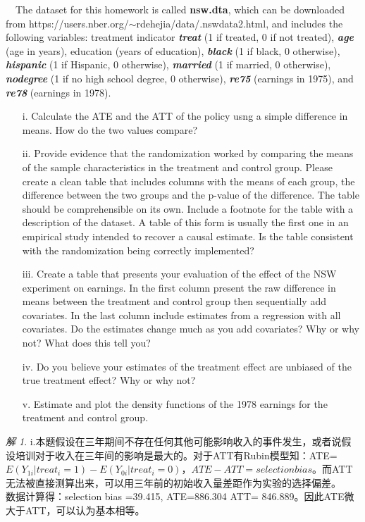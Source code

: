 \documentclass[a4paper]{ctexart}
\theoremstyle{remark}
\newtheorem*{solution}{解}
\begin{document}
\begin{itemize}
~~The dataset for this homework is called \textbf{nsw.dta}, which can be downloaded from https://users.nber.org/$\sim$rdehejia/data/.nswdata2.html,  and includes the following variables: treatment indicator \textit{\textbf{treat}} (1 if treated, 0 if not treated), \textit{\textbf{age}} (age in years), education (years of education), \textit{\textbf{black}} (1 if black, 0 otherwise), \textit{\textbf{hispanic}} (1 if Hispanic, 0 otherwise), \textit{\textbf{married}} (1 if married, 0 otherwise), \textit{\textbf{nodegree}} (1 if no high school degree, 0 otherwise), \textit{\textbf{re75}} (earnings in 1975), and \textit{\textbf{re78}} (earnings in 1978). 

\begin{enumerate}
\item[i.] Calculate the ATE and the ATT of the policy usng a simple difference in means. How do the two values compare?
\item[ii.] Provide evidence that the randomization worked by comparing the means of the sample characteristics in the treatment and control group. Please create a clean table that includes columns with the means of each group, the difference between the two groups and the p-value of the difference. The table should be comprehensible on its own. Include a footnote for the table with a description of the dataset. A table of this form is usually the first one in an empirical study intended to recover a causal estimate. Is the table consistent with the randomization being correctly implemented?
\item[iii.]  Create a table that presents your evaluation of the effect of the NSW experiment on earnings. In the first column present the raw difference in means between the treatment and control group then sequentially add covariates. In the last column include estimates from a regression with all covariates. Do the estimates change much as you add covariates? Why or why not? What does this tell you?
\item[iv.]  Do you believe your estimates of the treatment effect are unbiased of the true treatment effect? Why or why not?
\item[v.]  Estimate and plot the density functions of the 1978 earnings for the treatment and control group.
\end{enumerate}

\begin{solution}
    i.本题假设在三年期间不存在任何其他可能影响收入的事件发生，或者说假设培训对于收入在三年间的影响是最大的。对于ATT有Rubin模型知：ATE=$E(Y_{1i}|treat_i=1)-E(Y_{0i}|treat_i=0)，ATE -ATT = selection bias$。而ATT无法被直接测算出来，可以用三年前的初始收入量差距作为实验的选择偏差。\\
    数据计算得：selection bias =39.415, ATE=886.304  ATT= 846.889。因此ATE微大于ATT，可以认为基本相等。\\


\end{solution}
\end{itemize}
\end{document}
